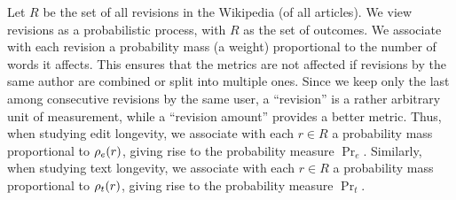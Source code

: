 Let $R$ be the set of all revisions in the Wikipedia (of all articles). 
We view revisions as a probabilistic process, with $R$ as the set of
outcomes.
We associate with each revision a probability mass (a weight)
proportional to the number of words it affects. 
This ensures that the metrics are not affected if revisions by the
same author are combined or split into multiple ones. 
Since we keep only the last among consecutive revisions by the same
user, a ``revision'' is a rather arbitrary unit of measurement, while
a ``revision amount'' provides a better metric. 
Thus, when studying edit longevity, we associate with each $r \in R$ a
probability mass proportional to $\rho_e(r)$, giving rise to the
probability measure $\Pr_e$. 
Similarly, when studying text longevity, we associate with each 
$r \in R$ a probability mass proportional to $\rho_t(r)$, giving
rise to the probability measure $\Pr_t$. 

